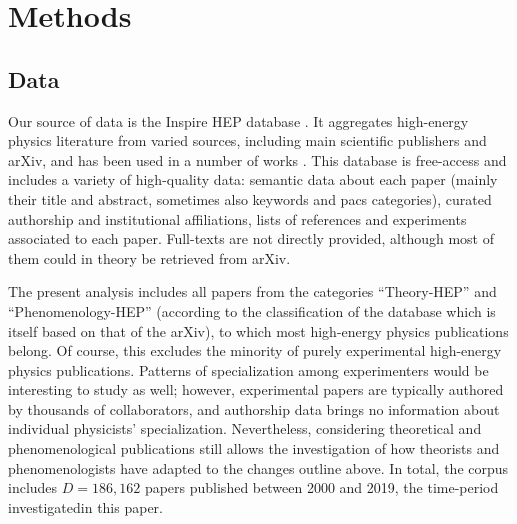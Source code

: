 \documentclass{article}
\begin{document}


\section{\label{sec:methods}Methods}

\subsection{\label{sec:data}Data}

Our source of data is the Inspire HEP database \citep{InspireAPI}. It aggregates high-energy physics literature from varied sources, including main scientific publishers and arXiv, and has been used in a number of works \citep{Perovi2016,Strumia2021,Sikimi2022,Gautheron2023}. This database is free-access and includes a variety of high-quality data: semantic data about each paper (mainly their title and abstract, sometimes also keywords and \gls{pacs} categories), curated authorship and institutional affiliations, lists of references and experiments associated to each paper. Full-texts are not directly provided, although most of them could in theory be retrieved from arXiv.

The present analysis includes all papers from the categories ``Theory-HEP'' and ``Phenomenology-HEP'' (according to the classification of the database which is itself based on that of the arXiv), to which most  high-energy physics publications belong. Of course, this excludes the minority of purely experimental high-energy physics publications. Patterns of specialization among experimenters would be interesting to study as well; however, experimental papers are typically authored by thousands of collaborators, and authorship data brings no information about individual physicists' specialization. Nevertheless, considering theoretical and phenomenological publications still allows the investigation of how theorists and phenomenologists have adapted to the changes outline above. In total, the corpus includes $D=186,162$ papers published between 2000 and 2019, the time-period investigatedin this paper. 
\end{document}
